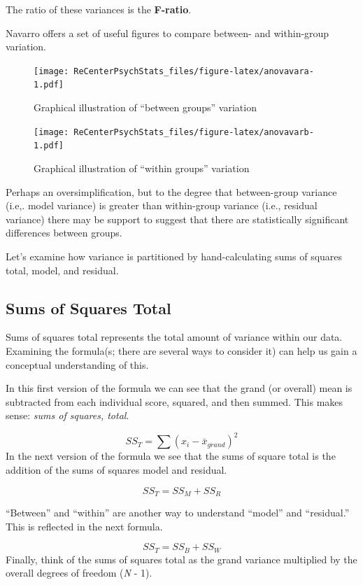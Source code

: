 \documentclass[
  english,
]{book}
\begin{document}
The ratio of these variances is the \textbf{F-ratio}.

Navarro \citeyearpar{navarro_book_2020} offers a set of useful figures to compare between- and within-group variation.

\begin{figure}
\centering
\texttt{[image: ReCenterPsychStats\_files/figure-latex/anovavara-1.pdf]}
\caption{\label{fig:anovavara}Graphical illustration of ``between groups'' variation}
\end{figure}

\begin{figure}
\centering
\texttt{[image: ReCenterPsychStats\_files/figure-latex/anovavarb-1.pdf]}
\caption{\label{fig:anovavarb}Graphical illustration of ``within groups'' variation}
\end{figure}

Perhaps an oversimplification, but to the degree that between-group variance (i.e,. model variance) is greater than within-group variance (i.e., residual variance) there may be support to suggest that there are statistically significant differences between groups.

Let's examine how variance is partitioned by hand-calculating sums of squares total, model, and residual.

\hypertarget{sums-of-squares-total}{%
\subsection{Sums of Squares Total}\label{sums-of-squares-total}}

Sums of squares total represents the total amount of variance within our data. Examining the formula(s; there are several ways to consider it) can help us gain a conceptual understanding of this.

In this first version of the formula we can see that the grand (or overall) mean is subtracted from each individual score, squared, and then summed. This makes sense: \emph{sums of squares, total}.

\[SS_{T}= \sum (x_{i}-\bar{x}_{grand})^{2}\]
In the next version of the formula we see that the sums of square total is the addition of the sums of squares model and residual.

\[SS_{T}= SS_{M} + SS_{R}\]

``Between'' and ``within'' are another way to understand ``model'' and ``residual.'' This is reflected in the next formula.

\[SS_{T}= SS_{B} + SS_{W}\]
Finally, think of the sums of squares total as the grand variance multiplied by the overall degrees of freedom (\emph{N} - 1).
\end{document}
